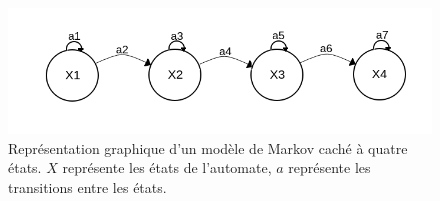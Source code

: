 \begin{figure}[h]
  \centering
  \includegraphics[width=16cm]{./Chapitre2/figures/hmm.png}
  \caption{Représentation graphique d'un modèle de Markov caché à quatre états. $X$ représente les états de l'automate, $a$ représente les transitions entre les états.}
  \label{fig:hmm}
\end{figure}

